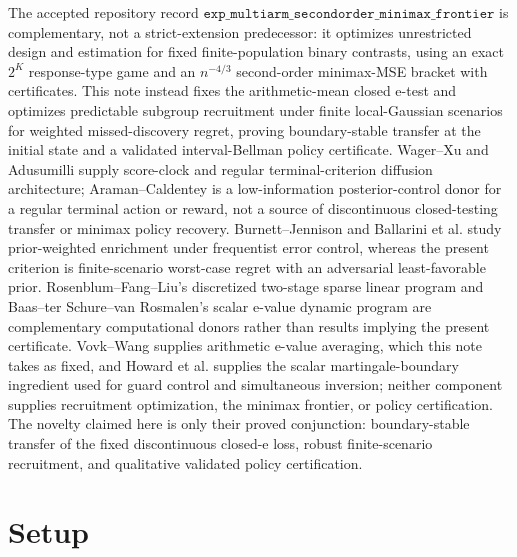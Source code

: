 \documentclass{article}
\begin{document}
The accepted repository record \(\mathtt{exp\_multiarm\_secondorder\_minimax\_frontier}\) is complementary, not a strict-extension predecessor: it optimizes unrestricted design and estimation for fixed finite-population binary contrasts, using an exact \(2^K\) response-type game and an \(n^{-4/3}\) second-order minimax-MSE bracket with certificates. This note instead fixes the arithmetic-mean closed e-test and optimizes predictable subgroup recruitment under finite local-Gaussian scenarios for weighted missed-discovery regret, proving boundary-stable transfer at the initial state and a validated interval-Bellman policy certificate. Wager--Xu and Adusumilli supply score-clock and regular terminal-criterion diffusion architecture; Araman--Caldentey is a low-information posterior-control donor for a regular terminal action or reward, not a source of discontinuous closed-testing transfer or minimax policy recovery. Burnett--Jennison and Ballarini et al. study prior-weighted enrichment under frequentist error control, whereas the present criterion is finite-scenario worst-case regret with an adversarial least-favorable prior. Rosenblum--Fang--Liu's discretized two-stage sparse linear program and Baas--ter Schure--van Rosmalen's scalar e-value dynamic program are complementary computational donors rather than results implying the present certificate. Vovk--Wang supplies arithmetic e-value averaging, which this note takes as fixed, and Howard et al. supplies the scalar martingale-boundary ingredient used for guard control and simultaneous inversion; neither component supplies recruitment optimization, the minimax frontier, or policy certification. The novelty claimed here is only their proved conjunction: boundary-stable transfer of the fixed discontinuous closed-e loss, robust finite-scenario recruitment, and qualitative validated policy certification.

\section{Setup}
\end{document}
